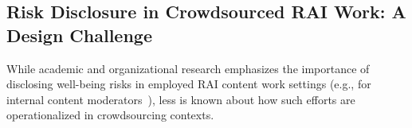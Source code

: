 


\subsection{Risk Disclosure in Crowdsourced RAI Work: A Design Challenge}
While academic and organizational research emphasizes the importance of disclosing well-being risks in employed RAI content work settings (e.g., for internal content moderators~\cite{bharucha2023content, qian2025locating}), less is known about how such efforts are operationalized in crowdsourcing contexts. %

